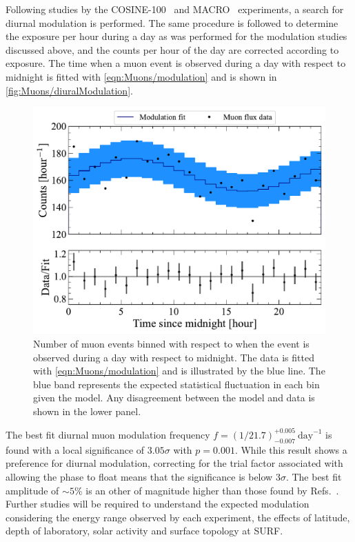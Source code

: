 Following studies by the COSINE-100~\cite{COSINE-100:2020jml} and MACRO~\cite{AMBROSIO1997109} experiments, a search for diurnal modulation is performed. The same procedure is followed to determine the exposure per hour during a day as was performed for the modulation studies discussed above, and the counts per hour of the day are corrected according to exposure. The time when a muon event is observed during a day with respect to midnight is fitted with \autoref{eqn:Muons/modulation} and is shown in \autoref{fig:Muons/diuralModulation}.
\begin{figure}
    \centering
    \includegraphics[width=0.8\linewidth]{figures/Muons/MuonModulation_TripleCoin.pdf}
    \caption[Diurnal muon modulation in muon flux data set.]{Number of muon events binned with respect to when the event is observed during a day with respect to midnight. The data is fitted with \autoref{eqn:Muons/modulation} and is illustrated by the blue line. The blue band represents the expected statistical fluctuation in each bin given the model. Any disagreement between the model and data is shown in the lower panel.}
    \label{fig:Muons/diuralModulation}
\end{figure}
The best fit diurnal muon modulation frequency $f=(1/21.7)^{+0.005}_{-0.007}~\text{day}^{-1}$ is found with a local significance of $3.05\sigma$ with $p=0.001$. While this result shows a preference for diurnal modulation, correcting for the trial factor associated with allowing the phase to float means that the significance is below $3\sigma$. The best fit amplitude of $\sim5\%$ is an other of magnitude higher than those found by Refs.~\cite{COSINE-100:2020jml,AMBROSIO1997109}. Further studies will be required to understand the expected modulation considering the energy range observed by each experiment, the effects of latitude, depth of laboratory, solar activity and surface topology at SURF.


